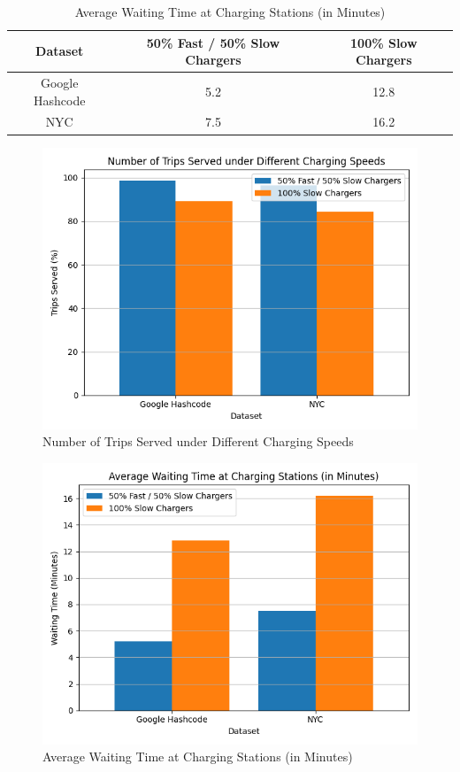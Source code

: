 \begin{table}[h]
\caption{Average Waiting Time at Charging Stations (in Minutes)}
\centering
\begin{tabular}{|c|c|c|}
\hline
\textbf{Dataset} & \textbf{50\% Fast / 50\% Slow Chargers} & \textbf{100\% Slow Chargers} \\
\hline
Google Hashcode & 5.2 & 12.8 \\
NYC & 7.5 & 16.2 \\
\hline
\end{tabular}
\label{tab:waiting_time}
\end{table}

\begin{figure}[h]
\centering
\includegraphics[scale=0.55]{Crest/Images/trips_served_charging_speed.png}
\caption{Number of Trips Served under Different Charging Speeds}
\label{fig:trips_served_charging_speed}
\end{figure}

\begin{figure}[h]
\centering
\includegraphics[scale=0.55]{Crest/Images/waiting_time_charging_speed.png}
\caption{Average Waiting Time at Charging Stations (in Minutes)}
\label{fig:waiting_time}
\end{figure}

